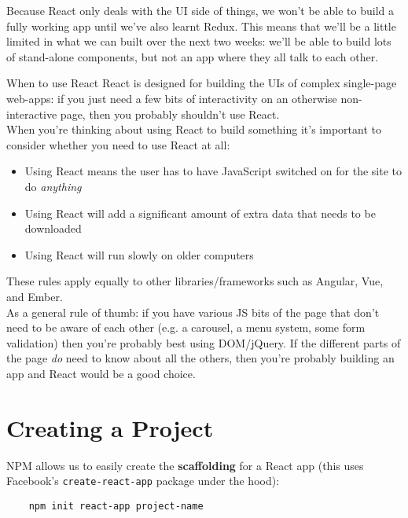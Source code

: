 Because React only deals with the UI side of things, we won't be able to build a fully working app until we've also learnt Redux. This means that we'll be a little limited in what we can built over the next two weeks: we'll be able to build lots of stand-alone components, but not an app where they all talk to each other.


\begin{infobox}{When to use React}
    React is designed for building the UIs of complex single-page web-apps: if you just need a few bits of interactivity on an otherwise non-interactive page, then you probably shouldn't use React.
    \\

    When you're thinking about using React to build something it's important to consider whether you need to use React at all:

    \begin{itemize}
        \item Using React means the user has to have JavaScript switched on for the site to do \textit{anything}
        \item Using React will add a significant amount of extra data that needs to be downloaded
        \item Using React will run slowly on older computers
    \end{itemize}

    These rules apply equally to other libraries/frameworks such as Angular, Vue, and Ember.
    \\

    As a general rule of thumb: if you have various JS bits of the page that don't need to be aware of each other (e.g. a carousel, a menu system, some form validation) then you're probably best using DOM/jQuery. If the different parts of the page \textit{do} need to know about all the others, then you're probably building an app and React would be a good choice.
\end{infobox}


\pagebreak


\section{Creating a Project}

NPM allows us to easily create the \textbf{scaffolding} for a React app (this uses Facebook's \texttt{create-react-app} package under the hood):

\begin{verbatim}
    npm init react-app project-name
\end{verbatim}

